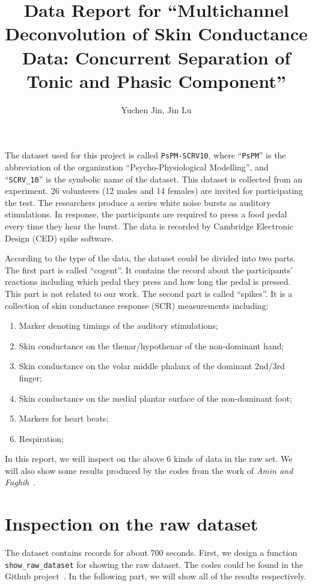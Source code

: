 \documentclass[]{article}
\title{Data Report for ``Multichannel Deconvolution of Skin Conductance Data: Concurrent Separation of Tonic and Phasic Component''}
\author{Yuchen Jin, Jin Lu}
\begin{document}
\maketitle

The dataset used for this project is called \texttt{PsPM-SCRV10}\cite{bach2014pspm}, where ``\texttt{PsPM}'' is the abbreviation of the organization ``Psycho-Physiological Modelling'', and ``\texttt{SCRV\_10}'' is the symbolic name of the dataset. This dataset is collected from an experiment. 26 volunteers (12 males and 14 females) are invited for participating the test. The researchers produce a series white noise bursts as auditory stimulations. In response, the participants are required to press a food pedal every time they hear the burst. The data is recorded by Cambridge Electronic Design (CED) spike software.

According to the type of the data, the dataset could be divided into two parts. The first part is called ``cogent''. It contains the record about the participants' reactions including which pedal they press and how long the pedal is pressed. This part is not related to our work. The second part is called ``spikes''. It is a collection of skin conductance response (SCR) measurements including:

\begin{enumerate}
  \item Marker denoting timings of the auditory stimulations;
  \item Skin conductance on the thenar/hypothenar of the non-dominant hand;
  \item Skin conductance on the volar middle phalanx of the dominant 2nd/3rd finger;
  \item Skin conductance on the medial plantar surface of the non-dominant foot;
  \item Markers for heart beats;
  \item Respiration;
\end{enumerate}

In this report, we will inspect on the above 6 kinds of data in the raw set. We will also show some results produced by the codes from the work of \textit{Amin and Faghih}~\cite{amin2019robust}.

\section{Inspection on the raw dataset}

The dataset contains records for about 700 seconds. First, we design a function \texttt{show\_raw\_dataset} for showing the raw dataset. The codes could be found in the Github project~\cite{jin2020}. In the following part, we will show all of the results respectively.
\end{document}
